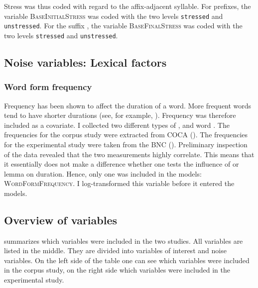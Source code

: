 Stress was thus coded with regard to the affix-adjacent syllable. For prefixes, the variable \textsc{BaseInitialStress} was coded with the two levels \texttt{stressed} and \texttt{unstressed}. For the suffix , the variable \textsc{BaseFinalStress} was coded with the two levels \texttt{stressed} and \texttt{unstressed}.



\subsection{Noise variables: Lexical factors}
\subsubsection{Word form frequency}
Frequency has been shown to affect the duration of a word. More frequent words tend to have shorter durations (see, for example, \citealt{Aylett.2004,Gahl.2008}). Frequency was therefore included as a covariate. I collected two different types of ,  and word . 
The frequencies for the corpus study were extracted from  {COCA} (\citealt{Davies.20082014}). The frequencies for the experimental study were taken from the BNC (\citealt{Davies.2004}).
Preliminary inspection of the data revealed that the two  measurements highly correlate. This means that it essentially does not make a difference whether one tests the influence of  or lemma  on duration. Hence, only one was included in the models: \textsc{WordFormFrequency}. I log-transformed this variable before it entered the models.

\subsection{Overview of variables}
 summarizes which variables were included in the two studies. All variables are listed in the middle. They are divided into variables of interest and noise variables. On the left side of the table one can see which variables were included in the corpus study, on the right side which variables were included in the experimental study.  


